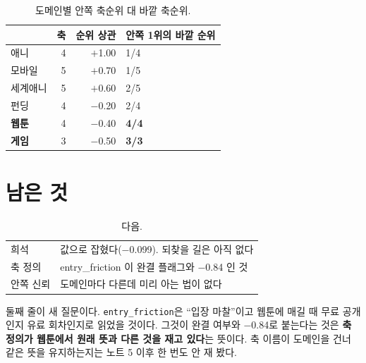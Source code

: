 \documentclass[10pt]{article}
\begin{document}

\begin{table}[t]
\centering\tsize
\caption{도메인별 안쪽 축순위 대 바깥 축순위.}
\begin{tabular}{lrrl}
\toprule
& 축 & 순위 상관 & 안쪽 1위의 바깥 순위 \\
\midrule
애니 & 4 & $+$1.00 & 1/4 \\
모바일 & 5 & $+$0.70 & 1/5 \\
세계애니 & 5 & $+$0.60 & 2/5 \\
펀딩 & 4 & $-$0.20 & 2/4 \\
\textbf{웹툰} & 4 & $-$0.40 & \textbf{4/4} \\
\textbf{게임} & 3 & $-$0.50 & \textbf{3/3} \\
\bottomrule
\end{tabular}
\end{table}


\section{남은 것}

\begin{table}[t]
\centering\tsize
\caption{다음.}
\begin{tabular}{ll}
\toprule
희석 & 값으로 잡혔다($-$0.099). 되찾을 길은 아직 없다 \\
축 정의 & entry\_friction 이 완결 플래그와 $-$0.84 인 것 \\
안쪽 신뢰 & 도메인마다 다른데 미리 아는 법이 없다 \\
\bottomrule
\end{tabular}
\end{table}

둘째 줄이 새 질문이다. \texttt{entry\_friction}은 ``입장 마찰''이고 웹툰에
매길 때 무료 공개인지 유료 회차인지로 읽었을 것이다. 그것이 완결 여부와
$-$0.84로 붙는다는 것은 \textbf{축 정의가 웹툰에서 원래 뜻과 다른 것을
재고 있다}는 뜻이다. 축 이름이 도메인을 건너 같은 뜻을 유지하는지는
노트 5 이후 한 번도 안 재 봤다.
\end{document}
